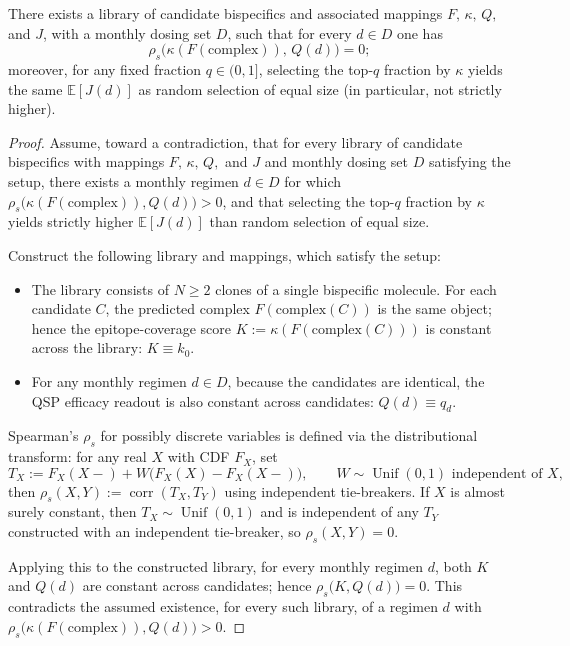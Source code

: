 ﻿\begin{theorem}\label{thm-no-ranking-gain}
There exists a library of candidate bispecifics and associated mappings $F,\,\kappa,\,Q,$ and $J$, with a monthly dosing set $D$, such that for every $d\in D$ one has
\[
\rho_s\bigl(\kappa(F(\mathrm{complex})),\, Q(d)\bigr)=0;
\]
moreover, for any fixed fraction $q\in(0,1]$, selecting the top-$q$ fraction by $\kappa$ yields the same $\mathbb{E}[J(d)]$ as random selection of equal size (in particular, not strictly higher).
\end{theorem}

\begin{proof}
Assume, toward a contradiction, that for every library of candidate bispecifics with mappings $F,\,\kappa,\,Q,$ and $J$ and monthly dosing set $D$ satisfying the setup, there exists a monthly regimen $d\in D$ for which $\rho_s\bigl(\kappa(F(\mathrm{complex})),Q(d)\bigr)>0$, and that selecting the top-$q$ fraction by $\kappa$ yields strictly higher $\mathbb{E}[J(d)]$ than random selection of equal size.

Construct the following library and mappings, which satisfy the setup:
\begin{itemize}
  \item The library consists of $N\ge 2$ clones of a single bispecific molecule. For each candidate $C$, the predicted complex $F(\mathrm{complex}(C))$ is the same object; hence the epitope-coverage score $K:=\kappa(F(\mathrm{complex}(C)))$ is constant across the library: $K\equiv k_0$.
  \item For any monthly regimen $d\in D$, because the candidates are identical, the QSP efficacy readout is also constant across candidates: $Q(d)\equiv q_d$.
\end{itemize}

Spearman's $\rho_s$ for possibly discrete variables is defined via the distributional transform: for any real $X$ with CDF $F_X$, set
\[
T_X:=F_X(X-) + W\bigl(F_X(X)-F_X(X-)\bigr),\qquad W\sim\operatorname{Unif}(0,1)\text{ independent of }X,
\]
then $\rho_s(X,Y):=\operatorname{corr}(T_X,T_Y)$ using independent tie-breakers. If $X$ is almost surely constant, then $T_X\sim\operatorname{Unif}(0,1)$ and is independent of any $T_Y$ constructed with an independent tie-breaker, so $\rho_s(X,Y)=0$.

Applying this to the constructed library, for every monthly regimen $d$, both $K$ and $Q(d)$ are constant across candidates; hence $\rho_s\bigl(K,Q(d)\bigr)=0$. This contradicts the assumed existence, for every such library, of a regimen $d$ with $\rho_s\bigl(\kappa(F(\mathrm{complex})),Q(d)\bigr)>0$.


\end{proof}
